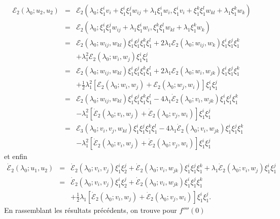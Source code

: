\documentclass{article}
\begin{document}
\begin{eqnarray*}
  \mathcal{E}_2 (λ_0 ; u_2, u_2) & = & \mathcal{E}_2 (λ_0 ;
  \xi_1^i v_i + \xi_1^i \xi_1^j w_{i  j} + λ_1 \xi_1^i w_i,
  \xi_1^i v_i + \xi_1^k \xi_1^l w_{k  l} + λ_1 \xi_1^k w_k)\\
  & = & \mathcal{E}_2 (λ_0 ; \xi_1^i \xi_1^j w_{i  j} +
  λ_1 \xi_1^i w_i, \xi_1^k \xi_1^l w_{k  l} + λ_1 \xi_1^k
  w_k)\\
  & = & \mathcal{E}_2 (λ_0 ; w_{i  j}, w_{k  l})
  \xi_1^i \xi_1^j \xi_1^k \xi_1^l + 2 λ_1 \mathcal{E}_2 (λ_0 ;
  w_{i  j}, w_k) \xi_1^i \xi_1^j \xi_1^k\\
  &  &  + λ_1^2 \mathcal{E}_2 (λ_0 ; w_i, w_j) \xi_1^i
  \xi_1^j\\
  & = & \mathcal{E}_2 (λ_0 ; w_{i  j}, w_{k  l})
  \xi_1^i \xi_1^j \xi_1^k \xi_1^l + 2 λ_1 \mathcal{E}_2 (λ_0 ;
  w_i, w_{j  k}) \xi_1^i \xi_1^j \xi_1^k\\
  &  &  + \tfrac{1}{2} λ_1^2  [\mathcal{E}_2 (λ_0 ; w_i,
  w_j) +\mathcal{E}_2 (λ_0 ; w_j, w_i)] \xi_1^i \xi_1^j\\
  & = & \mathcal{E}_2 (λ_0 ; w_{i  j}, w_{k  l})
  \xi_1^i \xi_1^j \xi_1^k \xi_1^l - 4 λ_1  \dot{\mathcal{E}}_2
  (λ_0 ; v_i, w_{j  k}) \xi_1^i \xi_1^j \xi_1^k\\
  &  &  - λ_1^2  [\dot{\mathcal{E}}_2 (λ_0 ; v_i, w_j) +
  \dot{\mathcal{E}}_2 (λ_0 ; v_j, w_i)] \xi_1^i \xi_1^j\\
  & = & \mathcal{E}_3 (λ_0 ; v_i, v_j, w_{k  l}) \xi_1^i
  \xi_1^j \xi_1^k \xi_1^l - 4 λ_1  \dot{\mathcal{E}}_2 (λ_0 ; v_i,
  w_{j  k}) \xi_1^i \xi_1^j \xi_1^k\\
  &  &  - λ_1^2  [\dot{\mathcal{E}}_2 (λ_0 ; v_i, w_j) +
  \dot{\mathcal{E}}_2 (λ_0 ; v_j, w_i)] \xi_1^i \xi_1^j
\end{eqnarray*}
et enfin
\begin{eqnarray*}
  \dot{\mathcal{E}}_2 (λ_0 ; u_1, u_2) & = & \dot{\mathcal{E}}_2
  (λ_0 ; v_i, v_j) \xi_1^i \xi_2^j + \dot{\mathcal{E}}_2 (λ_0 ;
  v_i, w_{j  k}) \xi_1^i \xi_1^j \xi_1^k + λ_1
  \dot{\mathcal{E}}_2 (λ_0 ; v_i, w_j) \xi_1^i \xi_1^j\\
  & = & \dot{\mathcal{E}}_2 (λ_0 ; v_i, v_j) \xi_1^i \xi_2^j +
  \dot{\mathcal{E}}_2 (λ_0 ; v_i, w_{j  k}) \xi_1^i \xi_1^j
  \xi_1^k\\
  &  &  + \tfrac{1}{2} λ_1  [\dot{\mathcal{E}}_2 (λ_0 ;
  v_i, w_j) + \dot{\mathcal{E}}_2 (λ_0 ; v_j, w_i)] \xi_1^i \xi_1^j .
\end{eqnarray*}
En rassemblant les résultats précédents, on trouve pour $f''''
(0)$
\end{document}
